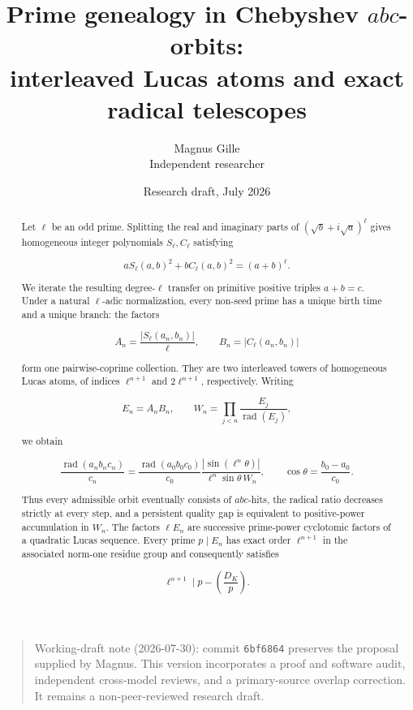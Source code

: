 \documentclass[11pt]{article}
\title{Prime genealogy in Chebyshev \(abc\)-orbits:\\
interleaved Lucas atoms and exact radical telescopes}
\author{Magnus Gille\\Independent researcher}
\date{Research draft, July 2026}
\begin{document}
\maketitle

\begin{quote}\small
Working-draft note (2026-07-30): commit \texttt{6bf6864} preserves the proposal
supplied by Magnus. This version incorporates a proof and software audit,
independent cross-model reviews, and a primary-source overlap correction.
It remains a non-peer-reviewed research draft.
\end{quote}

\begin{abstract}

Let \(\ell\) be an odd prime. Splitting the real and imaginary parts of
\((\sqrt b+i\sqrt a)^\ell\) gives homogeneous integer polynomials
\(S_\ell,C_\ell\) satisfying

\[
aS_\ell(a,b)^2+bC_\ell(a,b)^2=(a+b)^\ell.
\]

We iterate the resulting degree-\(\ell\) transfer on primitive positive
triples \(a+b=c\). Under a natural \(\ell\)-adic normalization, every
non-seed prime has a unique birth time and a unique branch: the factors

\[
A_n=\frac{|S_\ell(a_n,b_n)|}{\ell},
\qquad
B_n=|C_\ell(a_n,b_n)|
\]

form one pairwise-coprime collection. They are two interleaved towers of
homogeneous Lucas atoms, of indices \(\ell^{n+1}\) and \(2\ell^{n+1}\),
respectively. Writing

\[
E_n=A_nB_n,
\qquad
W_n=\prod_{j<n}\frac{E_j}{\operatorname{rad}(E_j)},
\]

we obtain

\[
\frac{\operatorname{rad}(a_nb_nc_n)}{c_n}
=
\frac{\operatorname{rad}(a_0b_0c_0)}{c_0}
\frac{|\sin(\ell^n\theta)|}
{\ell^n\sin\theta\,W_n},
\qquad
\cos\theta=\frac{b_0-a_0}{c_0}.
\]

Thus every admissible orbit eventually consists of \(abc\)-hits, the
radical ratio decreases strictly at every step, and a persistent quality
gap is equivalent to positive-power accumulation in \(W_n\). The factors
\(\ell E_n\) are successive prime-power cyclotomic factors of a quadratic
Lucas sequence. Every prime \(p\mid E_n\) has exact order
\(\ell^{n+1}\) in the associated norm-one residue group and consequently
satisfies

\[
\ell^{n+1}\mid p-\left(\frac{D_K}{p}\right).
\]


\end{abstract}
\end{document}
